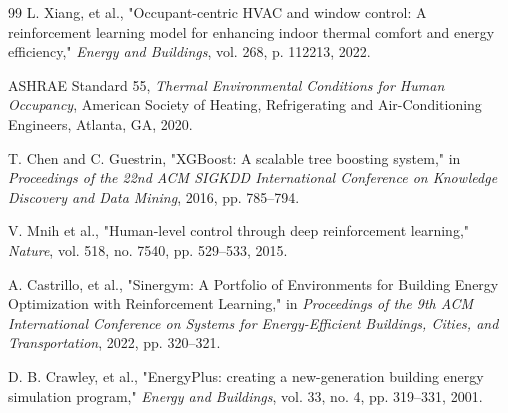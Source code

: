 \documentclass[12pt, a4paper]{article}
\begin{document}
\begin{thebibliography}{99}
L. Xiang, et al., "Occupant-centric HVAC and window control: A reinforcement learning model for enhancing indoor thermal comfort and energy efficiency," \textit{Energy and Buildings}, vol. 268, p. 112213, 2022.

ASHRAE Standard 55, \textit{Thermal Environmental Conditions for Human Occupancy}, American Society of Heating, Refrigerating and Air-Conditioning Engineers, Atlanta, GA, 2020.

T. Chen and C. Guestrin, "XGBoost: A scalable tree boosting system," in \textit{Proceedings of the 22nd ACM SIGKDD International Conference on Knowledge Discovery and Data Mining}, 2016, pp. 785--794.

V. Mnih et al., "Human-level control through deep reinforcement learning," \textit{Nature}, vol. 518, no. 7540, pp. 529--533, 2015.

A. Castrillo, et al., "Sinergym: A Portfolio of Environments for Building Energy Optimization with Reinforcement Learning," in \textit{Proceedings of the 9th ACM International Conference on Systems for Energy-Efficient Buildings, Cities, and Transportation}, 2022, pp. 320--321.

D. B. Crawley, et al., "EnergyPlus: creating a new-generation building energy simulation program," \textit{Energy and Buildings}, vol. 33, no. 4, pp. 319--331, 2001.
\end{thebibliography}
\end{document}
